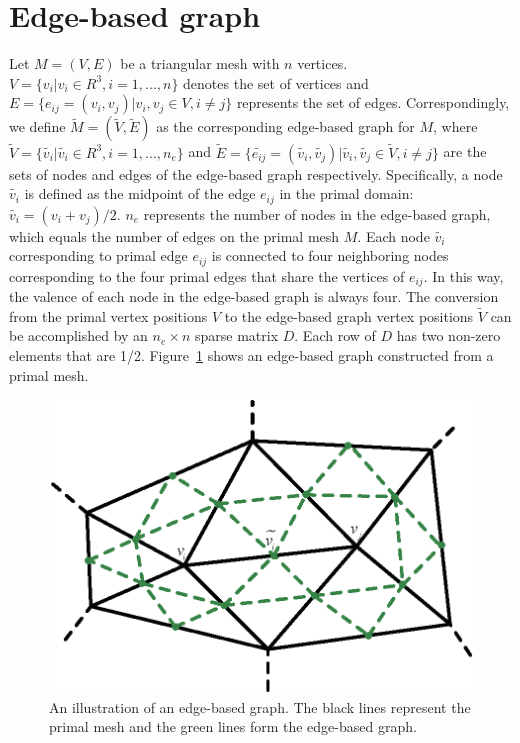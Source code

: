 \section{Edge-based graph} \label{ch5:sec:alg:edgegraph}
Let
$M=(V,E)$ be a triangular mesh with $n$ vertices. $V=\{v_i|v_i\in
R^3,i=1,...,n\}$ denotes the set of vertices and
$E=\{e_{ij}=(v_i,v_j)|v_i,v_j\in V,i\neq j\}$ represents the set of
edges. Correspondingly, we define $\tilde{M}=(\tilde{V},\tilde{E})$
as the corresponding edge-based graph for $M$, where
$\tilde{V}=\{\tilde{v_i}|\tilde{v_i}\in R^3,i=1,...,n_e\}$ and
$\tilde{E}=\{\tilde{e_{ij}}=(\tilde{v_i},\tilde{v_j})|\tilde{v_i},\tilde{v_j}\in
\tilde{V},i\neq j\}$ are the sets of nodes and edges of the
edge-based graph respectively. Specifically, a node $\tilde{v_i}$ is
defined as the midpoint of the edge $e_{ij}$  in the primal domain:
$\tilde{v_i}=(v_i+v_j)/2$. $n_e$ represents the number of nodes in
the edge-based graph, which equals the number of edges on the primal
mesh $M$. Each node $\tilde{v_i}$ corresponding to primal edge
$e_{ij}$ is connected to four neighboring nodes corresponding to the
four primal edges that share the vertices of $e_{ij}$. In this way,
the valence of each node in the edge-based graph is always four. The
conversion from the primal vertex positions $V$ to the edge-based
graph vertex positions $\tilde{V}$ can be accomplished by an
$n_e\times n$ sparse matrix $D$. Each row of $D$ has two non-zero
elements that are 1/2. Figure~\ref{fig:edgebasedgraph} shows an
edge-based graph constructed from a primal mesh.

\begin{figure} [htbp]
    \centering
  \includegraphics[scale=0.6]{figs/f5.2.edge-based-graph.eps}
  \caption{An illustration of an edge-based graph. The black lines represent the primal mesh and the green lines form the edge-based graph.}
  \label{fig:edgebasedgraph} %
\end{figure}



